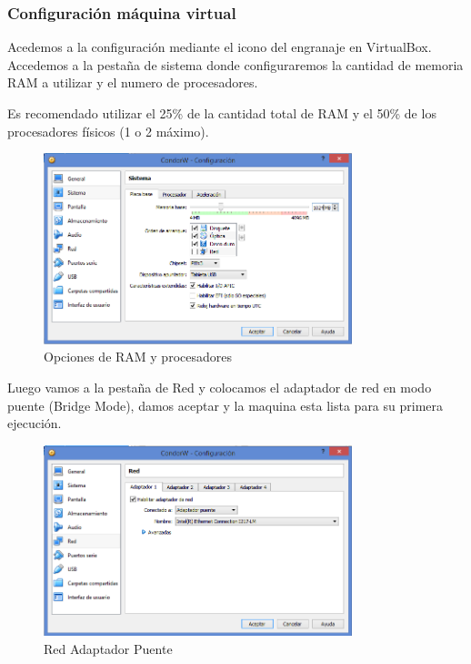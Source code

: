 \subsubsection*{Configuración máquina virtual}

Acedemos a la configuración mediante el icono del engranaje en VirtualBox.
Accedemos a la pestaña de sistema donde configuraremos la cantidad de memoria RAM a utilizar y el numero de procesadores.

Es recomendado utilizar el 25\%  de la cantidad total de RAM y el 50\% de los procesadores físicos (1 o 2 máximo).

\begin{figure}[h]
\centering
\includegraphics[width=0.8\textwidth]{windows/25ram.PNG}
\decoRule
\caption{Opciones de RAM y procesadores }
\label{fig:VM RAM}
\end{figure}
\FloatBarrier

Luego vamos a la pestaña de Red y colocamos el adaptador de red en modo puente (Bridge Mode), damos aceptar y la maquina esta lista para su primera ejecución.

\begin{figure}[h]
\centering
\includegraphics[width=0.8\textwidth]{windows/redpuente.PNG}
\decoRule
\caption{Red Adaptador Puente }
\label{fig:VM NET}
\end{figure}
\FloatBarrier

